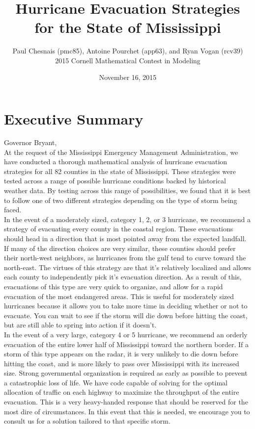 \documentclass[titlepage]{article}
\title{Hurricane Evacuation Strategies for the State of Mississippi}
\author{Paul Chesnais (pmc85), Antoine Pourchet (app63), and Ryan Vogan (rcv39)\\2015 Cornell Mathematical Contest in Modeling}
\date{November 16, 2015}
\begin{document}
\maketitle
\thispagestyle{empty}

\section{Executive Summary}
\label{sec:summary}
\vspace{1cm}
Governor Bryant,\\

At the request of the Mississippi Emergency Management Administration, we have conducted a thorough mathematical analysis of hurricane evacuation strategies for all 82 counties in the state of Mississippi. These strategies were tested across a range of possible hurricane conditions backed by historical weather data. By testing across this range of possibilities, we found that it is best to follow one of two different strategies depending on the type of storm being faced.\\

In the event of a moderately sized, category 1, 2, or 3 hurricane, we recommend a strategy of evacuating every county in the coastal region. These evacuations should head in a direction that is most pointed away from the expected landfall. If many of the direction choices are very similar, these counties should prefer their north-west neighbors, as hurricanes from the gulf tend to curve toward the north-east. The virtues of this strategy are that it's relatively localized and allows each county to independently pick it's evacuation direction. As a result of this, evacuations of this type are very quick to organize, and allow for a rapid evacuation of the most endangered areas. This is useful for moderately sized hurricanes because it allows you to take more time in deciding whether or not to evacuate. You can wait to see if the storm will die down before hitting the coast, but are still able to spring into action if it doesn't.\\

In the event of a very large, category 4 or 5 hurricane, we recommend an orderly evacuation of the entire lower half of Mississippi toward the northern border. If a storm of this type appears on the radar, it is very unlikely to die down before hitting the coast, and is more likely to pass over Mississippi with its increased size. Strong governmental organization is required as early as possible to prevent a catastrophic loss of life. We have code capable of solving for the optimal allocation of traffic on each highway to maximize the throughput of the entire evacuation. This is a very heavy-handed response that should be reserved for the most dire of circumstances. In this event that this is needed, we encourage you to consult us for a solution tailored to that specific storm.\\
\end{document}
